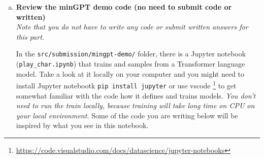 \begin{enumerate}[(a)]
\item {} \textbf{Review the minGPT demo code (no need to submit code or written)}\\

\textit{Note that you do not have to write any code or submit written answers for this part.}

In the \texttt{src/submission/mingpt-demo/} folder, there is a Jupyter notebook (\texttt{play\_char.ipynb}) that trains and samples from a Transformer language model.
Take a look at it locally on your computer and you might need to install Jupyter notebootk \texttt{pip install jupyter} or use vscode \footnote{\url{https://code.visualstudio.com/docs/datascience/jupyter-notebooks}} to get somewhat familiar with the code how it defines and trains models. \textit{You don't need to run the train locally, because training will take long time on CPU on your local environment.}
Some of the code you are writing below will be inspired by what you see in this notebook.





\end{enumerate}
